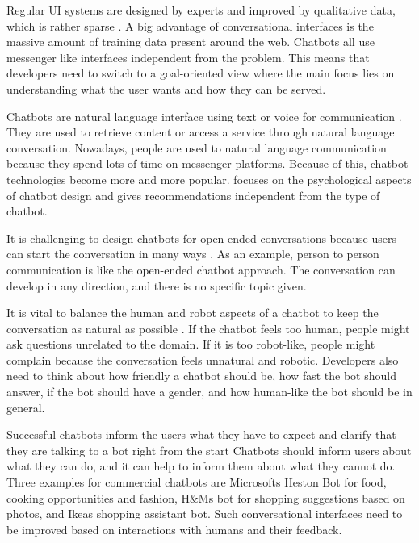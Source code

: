 Regular UI systems are designed by experts and improved by qualitative data, which is rather sparse \cite{folstad2017chatbots}.
A big advantage of conversational interfaces is the massive amount of training data present around the web. 
Chatbots all use messenger like interfaces independent from the problem.
This means that developers need to switch to a goal-oriented view where the main focus lies on understanding what the user wants and how they can be served.

Chatbots are natural language interface using text or voice for communication \citet{brandtzaeg2018chatbots}.
They are used to retrieve content or access a service through natural language conversation.
Nowadays, people are used to natural language communication because they spend lots of time on messenger platforms.
Because of this, chatbot technologies become more and more popular.
\citet{brandtzaeg2018chatbots} focuses on the psychological aspects of chatbot design and gives recommendations independent from the type of chatbot.

It is challenging to design chatbots for open-ended conversations because users can start the conversation in many ways \cite{brandtzaeg2018chatbots}.
As an example, person to person communication is like the open-ended chatbot approach.
The conversation can develop in any direction, and there is no specific topic given.

It is vital to balance the human and robot aspects of a chatbot to keep the conversation as natural as possible \cite{brandtzaeg2018chatbots}.
If the chatbot feels too human, people might ask questions unrelated to the domain.
If it is too robot-like, people might complain because the conversation feels unnatural and robotic.
Developers also need to think about how friendly a chatbot should be, how fast the bot should answer, if the bot should have a gender, and how human-like the bot should be in general.

Successful chatbots inform the users what they have to expect and clarify that they are talking to a bot right from the start \cite{brandtzaeg2018chatbots}
Chatbots should inform users about what they can do, and it can help to inform them about what they cannot do.
Three examples for commercial chatbots are Microsofts Heston Bot for food, cooking opportunities and fashion, H\&Ms bot for shopping suggestions based on photos, and Ikeas shopping assistant bot.
Such conversational interfaces need to be improved based on interactions with humans and their feedback.


